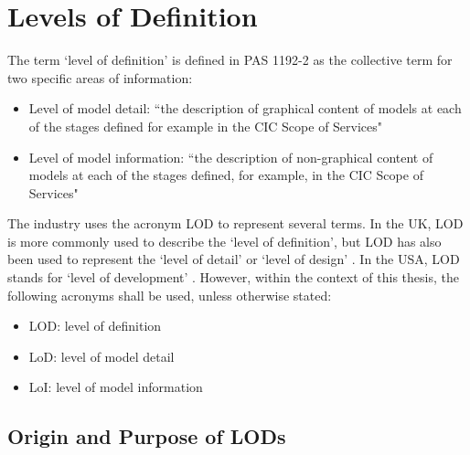 
\section{Levels of Definition} \label{section:LODs}



The term `level of definition' is defined in PAS 1192-2 \citep{PAS1192} as the collective term for two specific areas of information:
\begin{itemize}
	\item Level of model detail: ``the description of graphical content of models at each of the stages defined for example in the CIC Scope of Services"
	\item Level of model information: ``the description of non-graphical content of models at each of the stages defined, for example, in the CIC Scope of Services"
\end{itemize}


The industry uses the acronym LOD to represent several terms. 
In the UK, LOD is more commonly used to describe the `level of definition', but LOD has also been used to represent the `level of detail' or `level of design' \citep{Fairhead2015:book}.
In the USA, LOD stands for `level of development' \citep{BIMForum2017}.
However, within the context of this thesis, the following acronyms shall be used, unless otherwise stated:
\begin{itemize}
	\item LOD: level of definition
	\item LoD: level of model detail
	\item LoI: level of model information
\end{itemize}


\subsection{Origin and Purpose of LODs}

